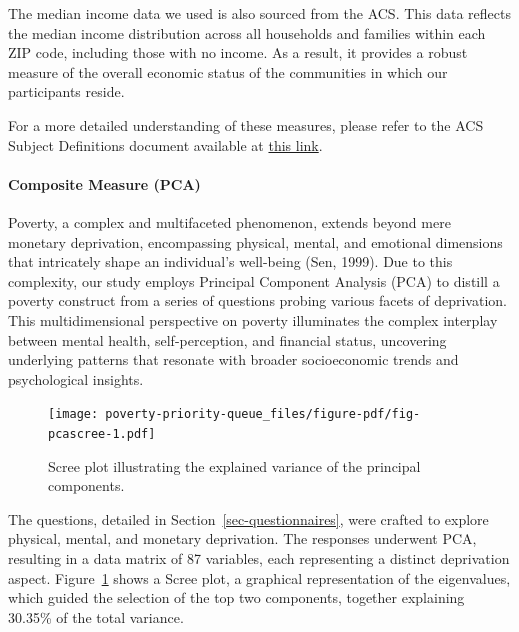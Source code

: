 \documentclass[
]{article}
\let\oldparagraph\paragraph
\renewcommand{\paragraph}[1]{\oldparagraph{#1}\mbox{}}
\begin{document}
The median income data we used is also sourced from the ACS. This data
reflects the median income distribution across all households and
families within each ZIP code, including those with no income. As a
result, it provides a robust measure of the overall economic status of
the communities in which our participants reside.

For a more detailed understanding of these measures, please refer to the
ACS Subject Definitions document available at
\href{https://www2.census.gov/programs-surveys/acs/tech_docs/subject_definitions/2021_ACSSubjectDefinitions.pdf}{this
link}.

\hypertarget{composite-measure-pca}{%
\paragraph{Composite Measure (PCA)}\label{composite-measure-pca}}

Poverty, a complex and multifaceted phenomenon, extends beyond mere
monetary deprivation, encompassing physical, mental, and emotional
dimensions that intricately shape an individual's well-being (Sen,
1999). Due to this complexity, our study employs Principal Component
Analysis (PCA) to distill a poverty construct from a series of questions
probing various facets of deprivation. This multidimensional perspective
on poverty illuminates the complex interplay between mental health,
self-perception, and financial status, uncovering underlying patterns
that resonate with broader socioeconomic trends and psychological
insights.

\begin{figure}

{\centering \texttt{[image: poverty-priority-queue\_files/figure-pdf/fig-pcascree-1.pdf]}

}

\caption{\label{fig-pcascree}Scree plot illustrating the explained
variance of the principal components.}

\end{figure}

The questions, detailed in Section~\ref{sec-questionnaires}, were
crafted to explore physical, mental, and monetary deprivation. The
responses underwent PCA, resulting in a data matrix of 87 variables,
each representing a distinct deprivation aspect.
Figure~\ref{fig-pcascree} shows a Scree plot, a graphical representation
of the eigenvalues, which guided the selection of the top two
components, together explaining 30.35\% of the total variance.
\end{document}
